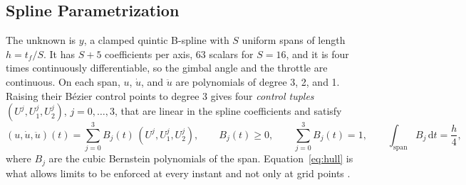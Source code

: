 \subsection{Spline Parametrization}
The unknown is $y$, a clamped quintic B-spline with $S$ uniform spans of length $h=t_f/S$. It has $S+5$ coefficients per axis,
63 scalars for $S=16$, and it is four times continuously differentiable, so the gimbal angle and the throttle are continuous.
On each span, $u$, $\dot u$, and $\ddot u$ are polynomials of degree 3, 2, and 1. Raising their B\'ezier control points to
degree 3 gives four \emph{control tuples} $(U^j,U_1^j,U_2^j)$, $j=0,\dots,3$, that are linear in the spline coefficients and satisfy
\begin{equation}\label{eq:hull}
(u,\dot u,\ddot u)(t)=\sum_{j=0}^{3}B_j(t)\,(U^j,U_1^j,U_2^j),\qquad B_j(t)\ge0,\qquad \sum_{j=0}^{3}B_j(t)=1,\qquad \int_{\mathrm{span}}B_j\,\mathrm dt=\frac h4 ,
\end{equation}
where $B_j$ are the cubic Bernstein polynomials of the span. Equation~\eqref{eq:hull} is what allows limits to be enforced at
every instant and not only at grid points \cite{vanloock2015}.

